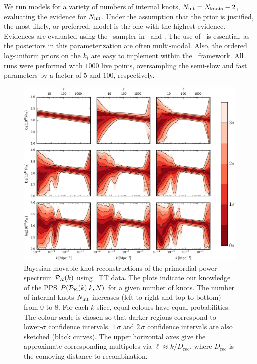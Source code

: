 We run models for a variety of numbers of internal knots, $N_\mathrm{int} =N_\mathrm{knots} -2$, evaluating the evidence for $N_\mathrm{int}$.
Under the assumption that the prior is justified, the most likely, or preferred, model is the one with the highest
evidence.  Evidences are evaluated using the \PolyChord\ sampler \citep{Polycord} 
in \CAMB\ and \CosmoMC. The use of \PolyChord\ is
essential, as the posteriors in this parameterization are often multi-modal. Also, the ordered log-uniform priors on
the $k_i$ are easy to implement within the \PolyChord\ framework. All runs were performed with $1000$ live points, 
oversampling the semi-slow and fast parameters by a factor of $5$ and $100$, respectively.

\begin{figure}
  \includegraphics[width=\textwidth]{chapter_pps_reconstruction/figures/array}
\caption{Bayesian movable knot reconstructions of the primordial power spectrum $\mathcal{P}_\mathcal{R}(k)$ using \Planck\ TT data.
The plots indicate our knowledge of the PPS $P(\mathcal{P}_\mathcal{R}(k)|k,N)$ for a given number of knots.
The number of internal knots $N_\mathrm{int}$ increases (left to right and top to bottom) from $0$ to $8$.
For each $k$-slice, equal colours have equal probabilities. The colour scale is chosen so that darker regions
correspond to lower-$\sigma$ confidence intervals.
$1\,\sigma $ and $2\,\sigma $ confidence intervals are also sketched (black curves).
The upper horizontal axes give the approximate corresponding multipoles via $\ell \approx k/D_\mathrm{rec}$,
where $D_\mathrm{rec}$ is the comoving distance to recombination.
    \label{fig:Pkr0}}
\end{figure}


